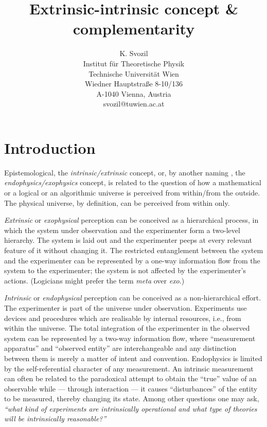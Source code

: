\documentclass{article}
\begin{document}
 \title{Extrinsic-intrinsic concept \& complementarity}
\author{K. Svozil\\
 {\small Institut f\"ur Theoretische Physik}  \\
  {\small Technische Universit\"at Wien   }     \\
  {\small Wiedner Hauptstra\ss e 8-10/136}    \\
  {\small A-1040 Vienna, Austria   }            \\
  {\small svozil@tuwien.ac.at}}
\date{}
\maketitle

\section{Introduction}
 Epistemological, the
 {\em intrinsic/extrinsic}
 concept, or, by another naming \cite{roessler-87,roessler-92}, the
{\em endo\-phy\-sics/exophysics}
 concept, is related to the question of how
 a mathematical or a logical or an algorithmic  universe
 is perceived   from within/from the outside.
 The physical universe, by definition, can be perceived
 from within only.

 {\em Extrinsic} or {\em exophysical}
 perception can be conceived as a hierarchical process, in which the
 system under observation and the experimenter form a two-level
 hierarchy. The system is laid out  and the experimenter peeps at
 every relevant feature of it without changing it.
 The restricted entanglement between the system and the experimenter
 can be represented by a one-way
 information flow from the system to the experimenter; the system is
 not affected by the experimenter's actions.
 (Logicians might prefer the term {\em meta} over {\em exo}.)


 {\em Intrinsic} or {\em endophysical} perception can be conceived
 as a non-hierarchical effort. The
 experimenter is part of the universe under observation.
 Experiments
 use devices and procedures
 which are realisable by internal resources, i.e., from within the
 universe.
 The total integration of the experimenter in the observed system can
 be represented
 by a  two-way information flow, where ``measurement apparatus'' and
 ``observed entity'' are
 interchangeable and any distinction between them
 is merely a matter of intent and
 convention.
 Endophysics
 is limited by the self-referential character of any measurement.
 An intrinsic measurement can often be related to the paradoxical
 attempt to obtain the
 ``true'' value of an observable while --- through interaction --- it
 causes ``disturbances'' of the entity to be measured, thereby changing
 its state.
 Among other questions one may ask,
{\em  ``what
 kind of experiments are intrinsically operational and what type of
 theories will be intrinsically reasonable?''}
\end{document}
